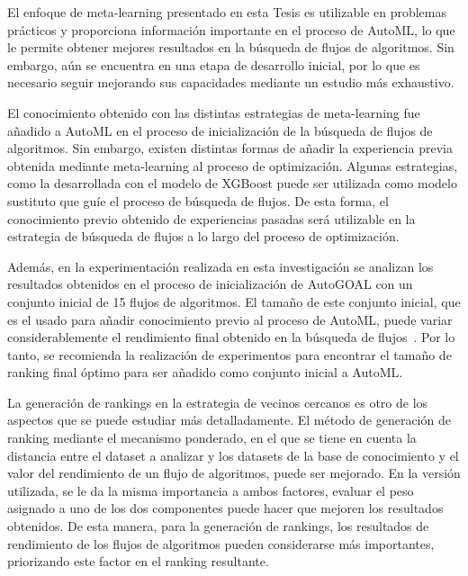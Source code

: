 \begin{recomendations}

El enfoque de meta-learning presentado en esta Tesis es utilizable en problemas prácticos y proporciona información importante en el proceso de AutoML, lo que le permite obtener mejores resultados en la búsqueda de flujos de algoritmos. Sin embargo, aún se encuentra en una etapa de desarrollo inicial, por lo que es necesario seguir mejorando sus capacidades mediante un estudio más exhaustivo.

El conocimiento obtenido con las distintas estrategias de meta-learning fue añadido a AutoML en el proceso de inicialización de la búsqueda de flujos de algoritmos. Sin embargo, existen distintas formas de añadir la experiencia previa obtenida mediante meta-learning al proceso de optimización. Algunas estrategias, como la desarrollada con el modelo de XGBoost puede ser utilizada como modelo sustituto que guíe el proceso de búsqueda de flujos. De esta forma, el conocimiento previo obtenido de experiencias pasadas será utilizable en la estrategia de búsqueda de flujos a lo largo del proceso de optimización.

Además, en la experimentación realizada en esta investigación se analizan los resultados obtenidos en el proceso de inicialización de AutoGOAL con un conjunto inicial de 15 flujos de algoritmos. El tamaño de este conjunto inicial, que es el usado para añadir conocimiento previo al proceso de AutoML, puede variar considerablemente el rendimiento final obtenido en la búsqueda de flujos~\cite{rankml}. Por lo tanto, se recomienda la realización de experimentos para encontrar el tamaño de ranking final óptimo para ser añadido como conjunto inicial a AutoML.

La generación de rankings en la estrategia de vecinos cercanos es otro de los aspectos que se puede estudiar más detalladamente. El método de generación de ranking mediante el mecanismo ponderado, en el que se tiene en cuenta la distancia entre el dataset a analizar y los datasets de la base de conocimiento y el valor del rendimiento de un flujo de algoritmos, puede ser mejorado. En la versión utilizada, se le da la misma importancia a ambos factores, evaluar el peso asignado a uno de los dos componentes puede hacer que mejoren los resultados obtenidos. De esta manera, para la generación de rankings, los resultados de rendimiento de los flujos de algoritmos pueden considerarse más importantes, priorizando este factor en el ranking resultante.


\end{recomendations}
